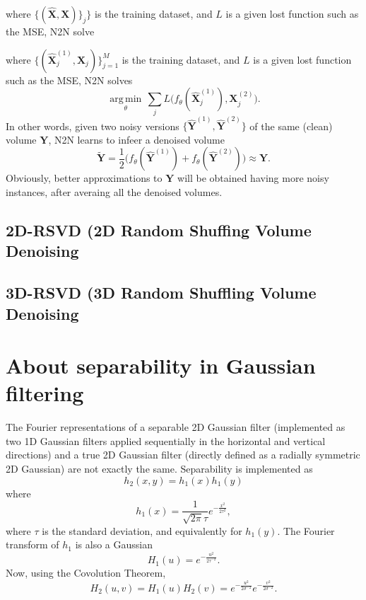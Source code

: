 \documentclass{article}
\begin{document}
where $\{(\hat{\mathbf{X}}, \mathbf{X})\}_j\}$ is the training
dataset, and $L$ is a given lost function such as the MSE, N2N solve

where $\{(\hat{\mathbf X}_j^{(1)}, {\mathbf X}_j)\}_{j=1}^M$ is the training
dataset, and $L$ is a given lost function such as the MSE, N2N solves
\begin{equation}
  \underset{\theta}{\operatorname{arg\,min}} \, \sum_j L \big(f_\theta(\hat{\mathbf X}_j^{(1)}), {\mathbf X}_j^{(2)}\big).
\end{equation}
In other words, given two noisy versions
$\{\hat{\mathbf Y}^{(1)}, \hat{\mathbf Y}^{(2)}\}$ of the same (clean)
volume ${\mathbf Y}$, N2N learns to infeer a denoised volume
\begin{equation}
  \tilde{\mathbf Y}=\frac{1}{2}\big(f_\theta(\hat{\mathbf Y}^{(1)})+f_\theta(\hat{\mathbf Y}^{(2)})\big)\approx{\mathbf Y}.
\end{equation}
Obviously, better approximations to ${\mathbf Y}$ will be obtained
having more noisy instances, after averaing all the denoised volumes.


\subsection{2D-RSVD (2D Random Shuffing Volume Denoising}

\subsection{3D-RSVD (3D Random Shuffling Volume Denoising}


\appendix
\section{About separability in Gaussian filtering}

\label{ape:separable_VS_no_separable_GD}
The Fourier representations of a separable 2D Gaussian filter
(implemented as two 1D Gaussian filters applied sequentially in the
horizontal and vertical directions) and a true 2D Gaussian filter
(directly defined as a radially symmetric 2D Gaussian) are not exactly
the same. Separability is implemented as
\begin{equation}
  h_2(x,y) = h_1(x)h_1(y)
\end{equation}
where
\begin{equation}
  h_1(x) = \frac{1}{\sqrt{2\pi}\tau}e^{-\frac{x^2}{2\tau^2}},
\end{equation}
where $\tau$ is the standard deviation, and equivalently for
$h_1(y)$. The Fourier transform of $h_1$ is also a Gaussian
\begin{equation}
  H_1(u) = e^{-\frac{u^2}{2\tau^{-2}}}.
\end{equation}
Now, using the Covolution Theorem,
\begin{equation}
  H_2(u, v) = H_1(u)H_2(v) = e^{-\frac{u^2}{2\sigma^{-2}}} e^{-\frac{v^2}{2\sigma^{-2}}}.
\end{equation}
\end{document}
